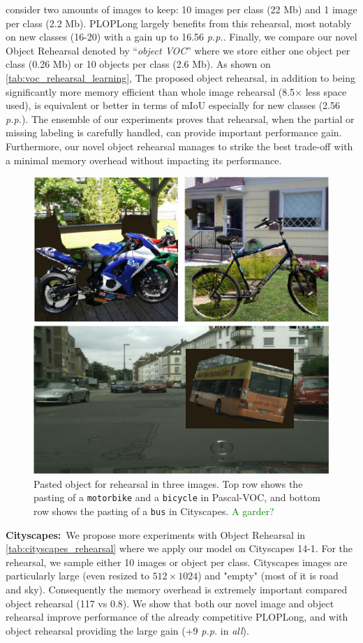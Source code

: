 consider two amounts of images to keep: 10 images per class (22 Mb) and 1 image per class (2.2 Mb).
PLOPLong largely benefits from this rehearsal, most notably on new classes (16-20) with a gain up to
16.56 \textit{p.p.}. Finally, we compare our novel Object Rehearsal denoted by ``\textit{object
    VOC}'' where we store either one object per class (0.26 Mb) or 10 objects per class (2.6 Mb). As
shown on \autoref{tab:voc_rehearsal_learning}, The proposed object rehearsal, in addition to being
significantly more memory efficient than whole image rehearsal (8.5$\times$ less space used), is
equivalent or better in terms of mIoU especially for new classes (2.56 \textit{p.p.}). The ensemble
of our experiments proves that rehearsal, when the partial or missing labeling is carefully handled,
can provide important performance gain. Furthermore, our novel object rehearsal manages to strike
the best trade-off with a minimal memory overhead without impacting its performance.

\begin{figure}
    \centering
    \includegraphics[width=0.7\linewidth]{images/seg/object_pasting.pdf}
    \caption{Pasted object for rehearsal in three images. Top row shows the pasting of a
        \texttt{motorbike} and a \texttt{bicycle} in Pascal-VOC, and bottom row shows the pasting of a
        \texttt{bus} in Cityscapes. \textcolor{green}{A garder?}}
    \label{fig:object_pasting}
\end{figure}

\noindent\textbf{Cityscapes:\,} We propose more experiments with Object Rehearsal in
\autoref{tab:cityscapes_rehearsal} where we apply our model on Cityscapes 14-1. For the rehearsal,
we sample either 10 images or object per class. Cityscapes images are particularly large (even
resized to $512 \times 1024$)  and "empty" (most of it is road and sky). Consequently the memory
overhead is extremely important compared object rehearsal (117 vs 0.8). We show that both our novel
image and object rehearsal improve performance of the already competitive PLOPLong, and with object
rehearsal providing the large gain (+9 \textit{p.p.} in \textit{all}).

